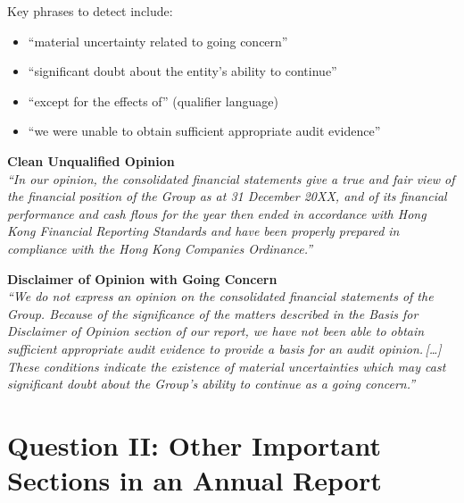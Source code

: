 \documentclass[12pt,a4paper]{article}
\begin{document}
Key phrases to detect include:

\begin{itemize}[leftmargin=1.5cm]
  \item ``material uncertainty related to going concern''
  \item ``significant doubt about the entity's ability to continue''
  \item ``except for the effects of'' (qualifier language)
  \item ``we were unable to obtain sufficient appropriate audit evidence''
\end{itemize}

\noindent
\begin{minipage}[t]{0.47\textwidth}
\textbf{Clean Unqualified Opinion}\\[0.3em]
\small\itshape
``In our opinion, the consolidated financial statements give a true and fair
view of the financial position of the Group as at 31 December 20XX, and of
its financial performance and cash flows for the year then ended in accordance
with Hong Kong Financial Reporting Standards and have been properly prepared
in compliance with the Hong Kong Companies Ordinance.''
\end{minipage}%
\hfill
\begin{minipage}[t]{0.47\textwidth}
\textbf{Disclaimer of Opinion with Going Concern}\\[0.3em]
\small\itshape
``We do not express an opinion on the consolidated financial statements of
the Group. Because of the significance of the matters described in the Basis
for Disclaimer of Opinion section of our report, we have not been able to
obtain sufficient appropriate audit evidence to provide a basis for an audit
opinion.\,[\ldots]\,These conditions indicate the existence of material
uncertainties which may cast significant doubt about the Group's ability to
continue as a going concern.''
\end{minipage}

\vspace{0.3em}

\section{Question II: Other Important Sections in an Annual Report}
\end{document}
